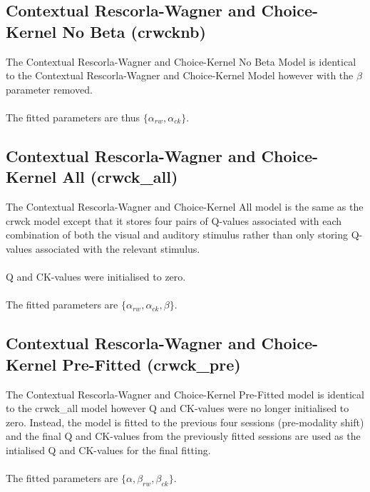 \documentclass[12pt]{article}
\begin{document}
\subsection{Contextual Rescorla-Wagner and Choice-Kernel No Beta (crwcknb)}
The Contextual Rescorla-Wagner and Choice-Kernel No Beta Model is identical to the Contextual Rescorla-Wagner and Choice-Kernel Model however with the $\beta$ parameter removed.\\\\
The fitted parameters are thus $\{\alpha_{rw}, \alpha_{ck}\}$.

\subsection{Contextual Rescorla-Wagner and Choice-Kernel All (crwck\_all)}
The Contextual Rescorla-Wagner and Choice-Kernel All model is the same as the crwck model except that it stores four pairs of Q-values associated with each combination of both the visual and auditory stimulus rather than only storing Q-values associated with the relevant stimulus.
\\\\
Q and CK-values were initialised to zero.
\\\\
The fitted parameters are $\{\alpha_{rw}, \alpha_{ck}, \beta\}$.

\subsection{Contextual Rescorla-Wagner and Choice-Kernel Pre-Fitted (crwck\_pre)}
The Contextual Rescorla-Wagner and Choice-Kernel Pre-Fitted model is identical to the crwck\_all model however Q and CK-values were no longer initialised to zero. Instead, the model is fitted to the previous four sessions (pre-modality shift) and the final Q and CK-values from the previously fitted sessions are used as the intialised Q and CK-values for the final fitting.
\\\\
The fitted parameters are $\{\alpha, \beta_{rw}, \beta_{ck}\}$.
\end{document}
